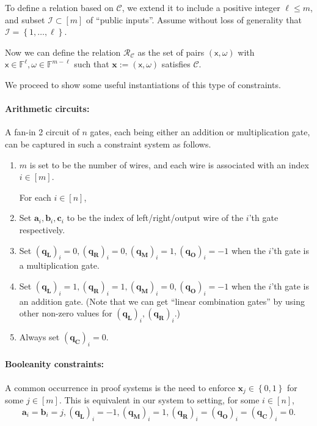 \documentclass[11pt]{article} %
\newcommand{\F}{\ensuremath{\mathbb F}\xspace}
\newcommand{\defeq}{:=}
\newcommand{\inp}{\ensuremath{\mathsf{x}}\xspace}
\newcommand{\wit}{\ensuremath{\omega}\xspace}
\newcommand{\rel}{\ensuremath{\mathcal{R}}\xspace}
\newcommand{\set}[1]{\ensuremath{\left\{#1\right\}}\xspace}
\newcommand{\selleft}{\ensuremath{\mathbf{q_L}}\xspace}
\newcommand{\selright}{\ensuremath{\mathbf{q_R}}\xspace}
\newcommand{\selout}{\ensuremath{\mathbf{q_O}}\xspace}
\newcommand{\selmult}{\ensuremath{\mathbf{q_M}}\xspace}
\newcommand{\selconst}{\ensuremath{\mathbf{q_C}}\xspace}
\newcommand{\lvar}{\ensuremath{\mathbf{a}}\xspace}
\newcommand{\rvar}{\ensuremath{\mathbf{b}}\xspace}
\newcommand{\ovar}{\ensuremath{\mathbf{c}}\xspace}
\newcommand{\pubvars}{\ensuremath{\mathcal{I}}\xspace}
\newcommand{\assignment}{\ensuremath{\mathbf{x}}\xspace}
\newcommand{\constsystem}{\ensuremath{\mathscr{C}}\xspace}
\newcommand{\relof}[1]{\ensuremath{\rel_{#1}}\xspace}
\begin{document}
To define a relation based on \constsystem, we extend it to include a positive integer $\ell\leq m$, and  subset $\pubvars \subset [m]$ of ``public inputs''. Assume without loss of generality that $\pubvars =\set{1,\ldots,\ell}$.

Now we can define the relation \relof{\constsystem} as the set of pairs $(\inp,\wit)$ with $\inp\in \F^\ell,\wit\in \F^{m-\ell}$ such 
that $\assignment\defeq (\inp,\wit)$ satisfies \constsystem.



We proceed to show some useful instantiations of this type of constraints.

\paragraph{Arithmetic circuits:}
A fan-in 2 circuit of $n$ gates, each being either an addition or multiplication gate, can be captured in such a constraint system as follows.
\begin{enumerate}
 \item $m$ is set to be the number of wires, and each wire is associated with an index $i\in [m]$.

 For each $i\in [n]$,
 \item Set $\lvar_i,\rvar_i,\ovar_i$ to be the index of left/right/output wire of the $i$'th gate respectively.
 \item Set $(\selleft)_i=0,(\selright)_i=0,(\selmult)_i=1,(\selout)_i=-1$ when the $i$'th gate is a multiplication gate.
 \item Set $(\selleft)_i=1,(\selright)_i=1,(\selmult)_i=0,(\selout)_i=-1$ when the $i$'th gate is an addition gate. (Note that we can get ``linear combination gates'' by using other non-zero values for $(\selleft)_i,(\selright)_i$.)

 
 \item Always set $(\selconst)_i=0$.
 
\end{enumerate}



\paragraph{Booleanity constraints:}
A common occurrence in proof systems is the need to enforce $\assignment_j \in \set{0,1}$ for some $j\in [m]$. This is equivalent in our system to setting, for some $i\in [n]$,
\[\lvar_i=\rvar_i=j,(\selleft)_i=-1, (\selmult)_i=1, (\selright)_i=(\selout)_i = (\selconst)_i =0.\]  
\end{document}
